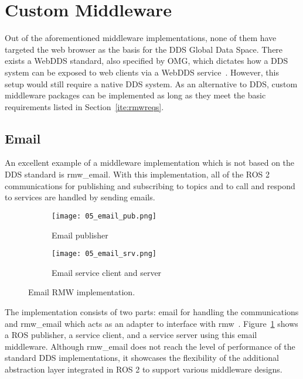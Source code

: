 \section{Custom Middleware}

    Out of the aforementioned middleware implementations, none of them have targeted the web browser as the basis for the \ac{DDS} Global Data Space. There exists a \ac{WebDDS} standard, also specified by \ac{OMG}, which dictates how a \ac{DDS} system can be exposed to web clients via a \ac{WebDDS} service~\cite{webdds}. However, this setup would still require a native \ac{DDS} system. As an alternative to \ac{DDS}, custom middleware packages can be implemented as long as they meet the basic requirements listed in Section~\ref{ite:rmwreqs}.

    \subsection{Email}

        An excellent example of a middleware implementation which is not based on the \ac{DDS} standard is \textsf{rmw\_email}. With this implementation, all of the \ac{ROS} 2 communications for publishing and subscribing to topics and to call and respond to services are handled by sending emails. 

        \begin{figure}[htbp]
            \centering
            \begin{subfigure}[t]{0.49\textwidth}
                \texttt{[image: 05\_email\_pub.png]}
                \caption{Email publisher}
            \end{subfigure}
            \begin{subfigure}[t]{0.49\textwidth}
                \texttt{[image: 05\_email\_srv.png]}
                \caption{Email service client and server}
            \end{subfigure}
            \vspace{1em}
            \caption{Email \ac{RMW} implementation.}
            \label{fig:email}
        \end{figure}

        The implementation consists of two parts: \textsf{email} for handling the communications and \textsf{rmw\_email} which acts as an adapter to interface with \textsf{rmw}~\cite{emailblog}. Figure~\ref{fig:email} shows a \ac{ROS} publisher, a service client, and a service server using this \textsf{email} middleware. Although \textsf{rmw\_email} does not reach the level of performance of the standard \ac{DDS} implementations, it showcases the flexibility of the additional abstraction layer integrated in \ac{ROS} 2 to support various middleware designs.


